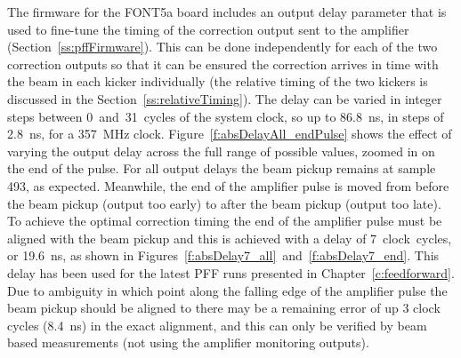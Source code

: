 The firmware for the FONT5a board includes an output delay parameter that is used to fine-tune the timing of the correction output sent to the amplifier (Section~\ref{ss:pffFirmware}). This can be done independently for each of the two correction outputs so that it can be ensured the correction arrives in time with the beam in each kicker individually (the relative timing of the two kickers is discussed in the Section~\ref{ss:relativeTiming}). 
The delay can be varied in integer steps between 0~and~31~cycles of the system clock, so up to 86.8~ns, in steps of 2.8~ns, for a 357~MHz clock. 
Figure~\ref{f:absDelayAll_endPulse} shows the effect of varying the output delay across the full range of possible values, zoomed in on the end of the pulse. For all output delays the beam pickup remains at sample 493, as expected. Meanwhile, the end of the amplifier pulse is moved from before the beam pickup (output too early) to after the beam pickup (output too late). To achieve the optimal correction timing the end of the amplifier pulse must be aligned with the beam pickup and this is achieved with a delay of 7~clock~cycles, or 19.6~ns, as shown in Figures~\ref{f:absDelay7_all}~and~\ref{f:absDelay7_end}. This delay has been used for the latest PFF runs presented in Chapter~\ref{c:feedforward}. Due to ambiguity in which point along the falling edge of the amplifier pulse the beam pickup should be aligned to there may be a remaining error of up 3 clock cycles (8.4~ns) in the exact alignment, and this can only be verified by beam based measurements (not using the amplifier monitoring outputs). 

